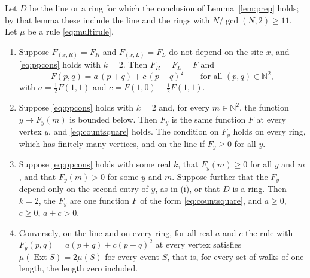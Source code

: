 \begin{theorem}\label{thm:posprod}
Let $D$ be the line or a ring for which the conclusion of Lemma~\ref{lem:prep} holds; by that lemma these include the line and the rings with $N/\gcd(N,2)\ge11$. Let $\mu$ be a rule \eqref{eq:multirule}.
\begin{enumerate}[label=(\roman*)]
\item Suppose $F_{(x,R)}=F_R$ and $F_{(x,L)}=F_L$ do not depend on the site $x$, and \eqref{eq:ppcons} holds with $k=2$. Then $F_R=F_L=F$ and
\begin{equation}\label{eq:countsquare}
F(p,q)=a\,(p+q)+c\,(p-q)^2\qquad\text{for all }(p,q)\in\mathbb{N}^2,
\end{equation}
with $a=\tfrac12F(1,1)$ and $c=F(1,0)-\tfrac12F(1,1)$.
\item Suppose \eqref{eq:ppcons} holds with $k=2$ and, for every $m\in\mathbb{N}^2$, the function $y\mapsto F_y(m)$ is bounded below. Then $F_y$ is the same function $F$ at every vertex $y$, and \eqref{eq:countsquare} holds. The condition on $F_y$ holds on every ring, which has finitely many vertices, and on the line if $F_y\ge0$ for all $y$.
\item Suppose \eqref{eq:ppcons} holds with some real $k$, that $F_y(m)\ge0$ for all $y$ and $m$, and that $F_y(m)>0$ for some $y$ and $m$. Suppose further that the $F_y$ depend only on the second entry of $y$, as in (i), or that $D$ is a ring. Then $k=2$, the $F_y$ are one function $F$ of the form \eqref{eq:countsquare}, and $a\ge0$, $c\ge0$, $a+c>0$.
\item Conversely, on the line and on every ring, for all real $a$ and $c$ the rule with $F_y(p,q)=a(p+q)+c(p-q)^2$ at every vertex satisfies $\mu(\operatorname{Ext}S)=2\mu(S)$ for every event $S$, that is, for every set of walks of one length, the length zero included.
\end{enumerate}
\end{theorem}

